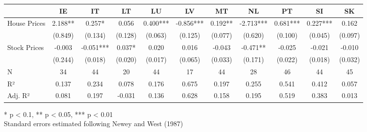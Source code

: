 \begin{table}[h]
\fontsize{7.5pt}{9.0pt}\selectfont
\begin{tabular*}{\linewidth}{@{\extracolsep{\fill}}lcccccccccc}
\toprule
  & IE & IT & LT & LU & LV & MT & NL & PT & SI & SK \\ 
\midrule\addlinespace[2.5pt]
House Prices & 2.188** & 0.257* & 0.056 & 0.400*** & -0.856*** & 0.192** & -2.713*** & 0.681*** & 0.227*** & 0.162 \\ 
 & (0.849) & (0.134) & (0.128) & (0.063) & (0.125) & (0.077) & (0.620) & (0.100) & (0.045) & (0.097) \\ 
Stock Prices & -0.003 & -0.051*** & 0.037* & 0.020 & 0.016 & -0.043 & -0.471** & -0.025 & -0.021 & -0.010 \\ 
{} & {(0.244)} & {(0.018)} & {(0.020)} & {(0.017)} & {(0.065)} & {(0.033)} & {(0.171)} & {(0.022)} & {(0.018)} & {(0.032)} \\ 
N & 34 & 44 & 20 & 44 & 17 & 44 & 28 & 46 & 44 & 45 \\ 
R² & 0.137 & 0.234 & 0.078 & 0.176 & 0.675 & 0.197 & 0.255 & 0.541 & 0.412 & 0.057 \\ 
Adj. R² & 0.081 & 0.197 & -0.031 & 0.136 & 0.628 & 0.158 & 0.195 & 0.519 & 0.383 & 0.013 \\ 
\bottomrule
\end{tabular*}
\begin{minipage}{\linewidth}
* p < 0.1, ** p < 0.05, *** p < 0.01\\
Standard errors estimated following Newey and West (1987)\\
\end{minipage}
\end{table}

